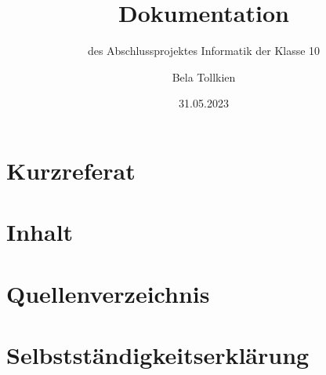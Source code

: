 \documentclass[
	fontsize=12pt,
	paper=a4,
	pagesize=auto,
	parskip=half,
    titlepage=true,
	ngerman
]{scrartcl}
\begin{document}
\title{
	Dokumentation
}
\subtitle{
	des Abschlussprojektes Informatik der Klasse 10
}
\author{
	Bela Tollkien
}
\date{31.05.2023}

\maketitle

\section{Kurzreferat}
% 
\section{Inhalt}
\tableofcontents
\section{Quellenverzeichnis}
\section{Selbstständigkeitserklärung}
\end{document}
